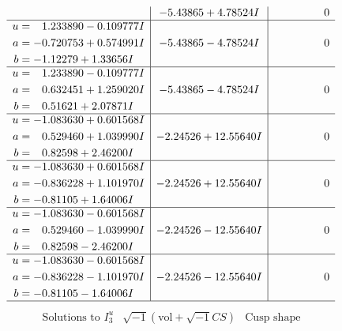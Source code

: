\documentclass[1p]{elsarticle_modified}
\theoremstyle{definition}
\newcommand{\I}{\sqrt{-1}}
\begin{document}
$$\begin{array}{c|c|c}
 & -5.43865 + 4.78524 I & \phantom{-0.000000 } 0 \\ \hline\begin{aligned}
u &= \phantom{-}1.233890 - 0.109777 I \\
a &= -0.720753 + 0.574991 I \\
b &= -1.12279 + 1.33656 I\end{aligned}
 & -5.43865 - 4.78524 I & \phantom{-0.000000 } 0 \\ \hline\begin{aligned}
u &= \phantom{-}1.233890 - 0.109777 I \\
a &= \phantom{-}0.632451 + 1.259020 I \\
b &= \phantom{-}0.51621 + 2.07871 I\end{aligned}
 & -5.43865 - 4.78524 I & \phantom{-0.000000 } 0 \\ \hline\begin{aligned}
u &= -1.083630 + 0.601568 I \\
a &= \phantom{-}0.529460 + 1.039990 I \\
b &= \phantom{-}0.82598 + 2.46200 I\end{aligned}
 & -2.24526 + 12.55640 I & \phantom{-0.000000 } 0 \\ \hline\begin{aligned}
u &= -1.083630 + 0.601568 I \\
a &= -0.836228 + 1.101970 I \\
b &= -0.81105 + 1.64006 I\end{aligned}
 & -2.24526 + 12.55640 I & \phantom{-0.000000 } 0 \\ \hline\begin{aligned}
u &= -1.083630 - 0.601568 I \\
a &= \phantom{-}0.529460 - 1.039990 I \\
b &= \phantom{-}0.82598 - 2.46200 I\end{aligned}
 & -2.24526 - 12.55640 I & \phantom{-0.000000 } 0 \\ \hline\begin{aligned}
u &= -1.083630 - 0.601568 I \\
a &= -0.836228 - 1.101970 I \\
b &= -0.81105 - 1.64006 I\end{aligned}
 & -2.24526 - 12.55640 I & \phantom{-0.000000 } 0\\
 \hline 
 \end{array}$$\newpage$$\begin{array}{c|c|c}  
\text{Solutions to }I^u_{3}& \I (\text{vol} + \sqrt{-1}CS) & \text{Cusp shape}\\

\end{array}$$
\end{document}
